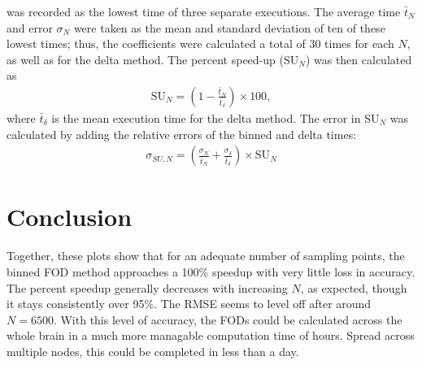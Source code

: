 \documentclass{article}
\begin{document}
was recorded as the lowest time of three separate executions. The average time
$\bar{t}_N$ and error $\sigma_N$ were taken as the mean and standard deviation
of ten of these lowest times; thus, the coefficients were calculated a total of
30 times for each $N$, as well as for the delta method. The percent speed-up (SU$_N$)
was then calculated as
\begin{align}
  \text{SU}_N = \left(1 - \frac{\bar{t}_N}{\bar{t}_{\delta}}\right)\times 100,
\end{align}
where $\bar{t}_{\delta}$ is the mean execution time for the delta method. The error
in SU$_N$ was calculated by adding the relative errors of the binned and delta times:
\begin{align}
  \sigma_{SU,N} = \left(\frac{\sigma_N}{\bar{t}_N} + \frac{\sigma_{\delta}}{\bar{t}_{\delta}}\right)\times \text{SU}_N
\end{align}

\section{Conclusion}
Together, these plots show that for an adequate number of sampling points, the
binned FOD method approaches a 100\% speedup with very little loss in accuracy.
The percent speedup generally decreases with increasing $N$, as expected, though
it stays consistently over 95\%. The RMSE seems to level off after around
$N=6500$. With this level of accuracy, the FODs could be calculated across the
whole brain in a much more managable computation time of  hours.
Spread across multiple nodes, this could be completed in less than a day. 



  
\end{document}
